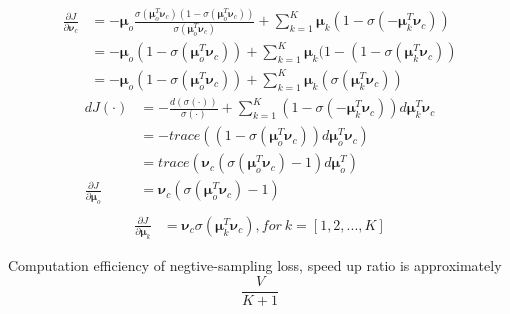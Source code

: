 \documentclass[11pt, oneside]{article}   	%
\begin{document}
\begin{align}
\frac{\partial J}{\partial \bm{\nu}_c} &= -\bm\mu_o\frac{\sigma(\bm{\mu}_o^T\bm\nu_c)(1-\sigma(\bm{\mu}_o^T\bm\nu_c))}{\sigma(\bm{\mu}_o^T\bm\nu_c)} + \sum_{k = 1}^K \bm\mu_k(1 - \sigma(-\bm\mu_k^T\bm\nu_c))\\
&= -\bm\mu_o(1-\sigma(\bm{\mu}_o^T\bm\nu_c)) + \sum_{k = 1}^K \bm\mu_k(1 - (1-\sigma(\bm\mu_k^T\bm\nu_c))\\
&= -\bm\mu_o(1-\sigma(\bm{\mu}_o^T\bm\nu_c)) +\sum_{k = 1}^K \bm\mu_k(\sigma(\bm\mu_k^T\bm\nu_c))
\end{align}
\begin{align}
d J(\cdot) &= - \frac{d(\sigma(\cdot))}{\sigma(\cdot)} +\sum_{k = 1}^{K}(1 - \sigma(-\bm\mu_k^T\bm\nu_c))d\bm\mu_k^T\bm\nu_c\\
&=- trace({(1-\sigma(\bm\mu_o^T \bm\nu_c)) d \bm\mu_o^T \bm\nu_c}) \\
&= trace(\bm\nu_c(\sigma(\bm\mu_o^T \bm\nu_c)-1)d \bm\mu_o^T)\\
\frac{\partial J}{\partial \bm{\mu}_o} &= \bm\nu_c(\sigma(\bm\mu_o^T \bm\nu_c)-1)\\
\end{align}
\begin{align}
\frac{\partial J}{\partial \bm{\mu}_k} &= \bm\nu_c\sigma(\bm\mu_k^T\bm\nu_c), for~k = [1, 2, ..., K]
\end{align}

Computation efficiency of negtive-sampling loss, speed up ratio is approximately
$$\frac{V}{K+1}$$
\end{document}
